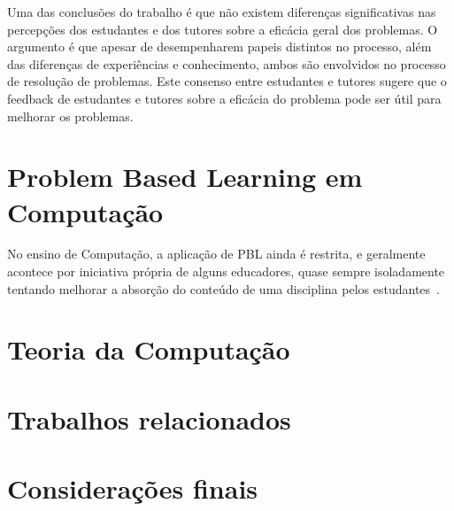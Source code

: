 Uma das conclusões do trabalho \cite{sockalingam2011student} é que
não existem diferenças significativas nas percepções dos estudantes
e dos tutores sobre a eficácia geral dos problemas.
O argumento é que apesar de desempenharem papeis distintos
no processo, além das diferenças de experiências e conhecimento,
ambos são envolvidos no processo de resolução de problemas.
Este consenso entre estudantes e tutores sugere que o feedback de estudantes
e tutores sobre a eficácia do problema pode ser útil para melhorar
os problemas.

\section{Problem Based Learning em Computação}
No ensino de Computação, a aplicação de PBL ainda é restrita, e geralmente
acontece por iniciativa própria de alguns educadores,
quase sempre isoladamente tentando melhorar a
absorção do conteúdo de uma disciplina
pelos estudantes~\cite{wood2003problem, o2012practical}.

\section{Teoria da Computação}
\section{Trabalhos relacionados}
\section{Considerações finais}
